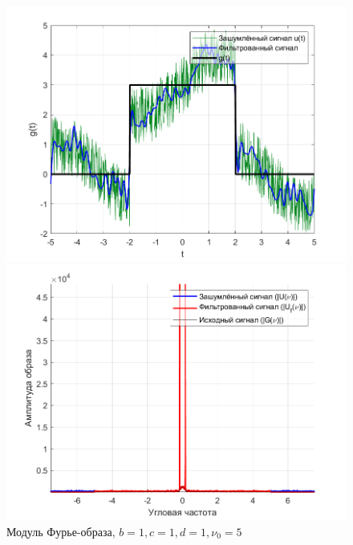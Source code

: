 \documentclass[a4paper]{article}
\begin{document}
\begin{figure}[H]
    \begin{minipage}{0.5\textwidth}
        \centering
        \includegraphics[width=\textwidth]{part2/1_1_1.png}
        \caption{$b = 1, c = 1, d = 1, \nu_0 = 5$}
    \end{minipage}    
    \begin{minipage}{0.5\textwidth}
        \centering
        \includegraphics[width=\textwidth]{part2/1_1_1_Fourier.png}
        \caption{Модуль Фурье-образа, $b = 1, c = 1, d = 1, \nu_0 = 5$}
    \end{minipage}
\end{figure}\
\end{document}

